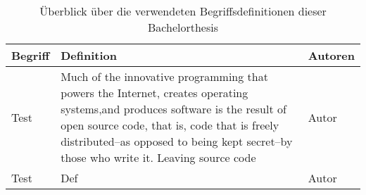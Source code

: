 \begin{table*}[h!]
	\centering
	
	\begin{tabular}{@{}lp{6.5cm}l@{}}\toprule[1.5pt]
		
		\textbf{Begriff} & \textbf{Definition} & \textbf{Autoren} \\ \midrule
		Test     & Much of the innovative programming that powers the Internet, creates operating systems,and produces software is the result of open source code, that is, code that is freely distributed--as opposed to being kept secret--by those who write it. Leaving source code  & Autor           \\
				
		Test                      & Def                 & Autor           \\
		
	\bottomrule[1.5pt]
	\end{tabular}

	\caption{Überblick über die verwendeten Begriffsdefinitionen dieser Bachelorthesis}
	\label{tab:definitionen}

\end{table*}